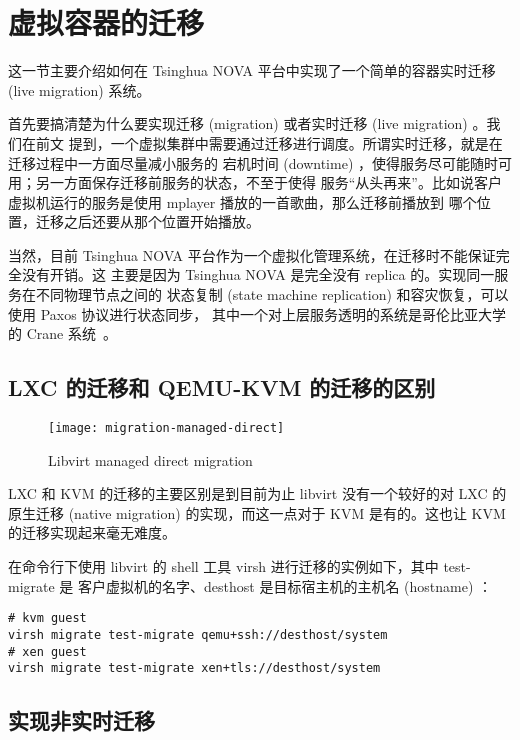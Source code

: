 \section{虚拟容器的迁移}

这一节主要介绍如何在 Tsinghua NOVA 平台中实现了一个简单的容器实时迁移 (live migration)
系统。

首先要搞清楚为什么要实现迁移 (migration) 或者实时迁移 (live migration) 。我们在前文
提到，一个虚拟集群中需要通过迁移进行调度。所谓实时迁移，就是在迁移过程中一方面尽量减小服务的
宕机时间 (downtime) ，使得服务尽可能随时可用；另一方面保存迁移前服务的状态，不至于使得
服务“从头再来”。比如说客户虚拟机运行的服务是使用 mplayer 播放的一首歌曲，那么迁移前播放到
哪个位置，迁移之后还要从那个位置开始播放。

当然，目前 Tsinghua NOVA 平台作为一个虚拟化管理系统，在迁移时不能保证完全没有开销。这
主要是因为 Tsinghua NOVA 是完全没有 replica 的。实现同一服务在不同物理节点之间的
状态复制 (state machine replication) 和容灾恢复，可以使用 Paxos 协议进行状态同步，
其中一个对上层服务透明的系统是哥伦比亚大学的 Crane 系统~\cite{cui2015p}。

\subsection{LXC 的迁移和 QEMU-KVM 的迁移的区别}

\begin{figure}[h]
    \centering
    \texttt{[image: migration-managed-direct]}
    \caption{Libvirt managed direct migration}
\end{figure}

LXC 和 KVM 的迁移的主要区别是到目前为止 libvirt 没有一个较好的对 LXC 的原生迁移 (native
 migration) 的实现，而这一点对于 KVM 是有的。这也让 KVM 的迁移实现起来毫无难度。

在命令行下使用 libvirt 的 shell 工具 virsh 进行迁移的实例如下，其中 test-migrate 是
客户虚拟机的名字、desthost 是目标宿主机的主机名 (hostname) ：

\begin{lstlisting}
# kvm guest
virsh migrate test-migrate qemu+ssh://desthost/system
# xen guest
virsh migrate test-migrate xen+tls://desthost/system
\end{lstlisting}

\subsection{实现非实时迁移}

